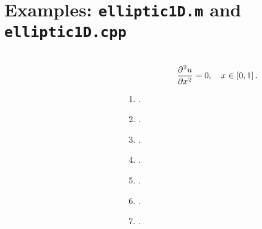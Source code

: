 \section{Examples: \texttt{elliptic1D.m} and \texttt{elliptic1D.cpp}}


\begin{frame}[fragile,b]
    \frametitle{\secname}
    \begin{columns}
        \begin{column}{0.48\textwidth}
            \begin{listing}[H]
                \tiny
                \centering
                \inputminted[linenos,firstline=1,lastline=42,highlightlines={16}]{octave}{../examples/octave/elliptic1D.m}
            \end{listing}
        \end{column}
        \begin{column}{0.48\textwidth}

            \begin{equation*}
                \diffp[2]{u}{x}=0,\quad x\in\left[0,1\right].
            \end{equation*}

            \begin{enumerate}
                \item .
                \item .
                \item .
                \item .
                \item .
                \item .
                \item .
            \end{enumerate}
        \end{column}
    \end{columns}
\end{frame}